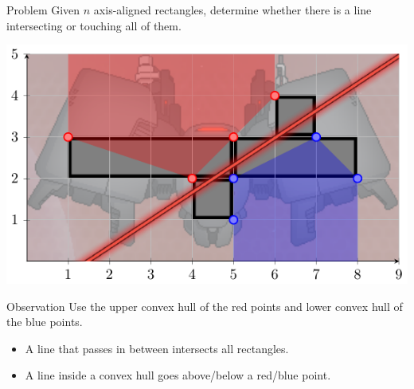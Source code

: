 \begin{frame}
    \frametitle{\problemtitle}
    \begin{block}{Problem}
        Given $n$ axis-aligned rectangles, determine whether there is a line
        intersecting or touching all of them.
    \end{block}
    \centering
    \includegraphics[height=0.4\textheight]{example5}
    \begin{block}{Observation}
    	Use the upper convex hull of the red points and lower convex
            hull of the blue points.
        \pause
        \begin{itemize}
        \item<+-> A line that passes in between intersects all rectangles.
        \item<+-> A line inside a convex hull goes above/below a red/blue point.
        \end{itemize}
    \end{block}
\end{frame}

